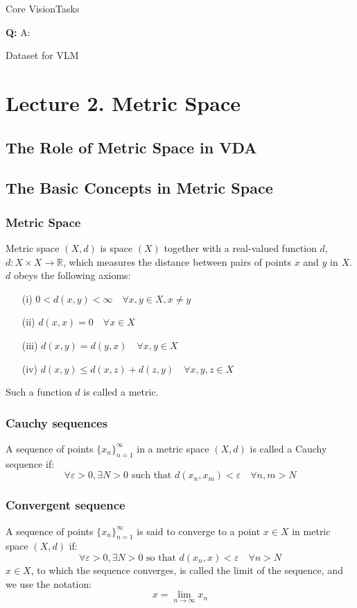 Core VisionTasks








\textbf{Q: }
A: 











Dataset for VLM
\newpage
\section{Lecture 2. Metric Space}
\subsection{The Role of Metric Space in VDA}
\subsection{The Basic Concepts in Metric Space}
\subsubsection{Metric Space}
Metric space $(X, d)$ is space $(X)$ together with a real-valued function \(d\), \(d: X \times X \rightarrow \mathbb{R}\), which measures the distance between pairs of points \(x\) and \(y\) in \(X\).\\
 \(d\) obeys the following axioms:
\begin{itemize}
    \item[(i)] \(0 < d(x, y) < \infty \quad \forall x, y \in X, x \neq y\)
    \item[(ii)] \(d(x, x) = 0 \quad \forall x \in X\)
    \item[(iii)] \(d(x, y) = d(y, x) \quad \forall x, y \in X\)
    \item[(iv)] \(d(x, y) \leq d(x, z) + d(z, y) \quad \forall x, y, z \in X\)
\end{itemize}
Such a function \(d\) is called a metric.

\subsubsection{Cauchy sequences}
A sequence of points \(\{x_n\}_{n=1}^\infty\) in a metric space $(X, d)$ is called a Cauchy sequence if:
\[
\forall \varepsilon > 0, \exists N > 0 \text{ such that } d(x_n, x_m) < \varepsilon \quad \forall n, m > N
\]
\subsubsection{Convergent sequence}
A sequence of points \(\{x_n\}_{n=1}^\infty\) is said to converge to a point \(x \in X\) in metric space $(X, d)$ if:
\[
\forall \varepsilon > 0, \exists N > 0 \text{ so that } d(x_n, x) < \varepsilon \quad \forall n > N
\]
\(x \in X\), to which the sequence converges, is called the limit of the sequence, and we use the notation:
\begin{equation*}
x = \lim_{n \to \infty} x_n
\end{equation*}

